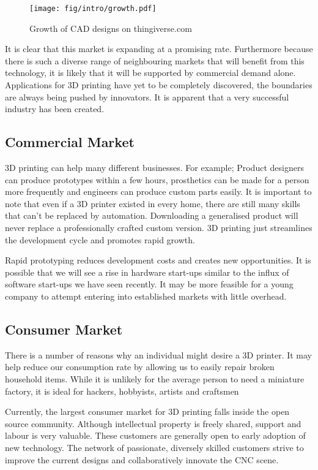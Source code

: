 \documentclass[a4paper, 11pt, twoside]{Thesis}  %
\begin{document}
\begin{figure}[H]
\centering%
\texttt{[image: fig/intro/growth.pdf]}
\caption{Growth of CAD designs on thingiverse.com \cite{6}}
\label{fig:growth.pdf}
\end{figure}
It is clear that this market is expanding at a promising rate. Furthermore because there is such a diverse range of neighbouring markets that will benefit from this technology, it is likely that it will be supported by commercial demand alone. Applications for 3D printing have yet to be completely discovered, the boundaries are always being pushed by innovators. It is apparent that a very successful industry has been created.


\subsection{Commercial Market}

3D printing can help many different businesses. For example; Product designers can produce prototypes within a few hours, prosthetics can be made for a person more frequently and engineers can produce custom parts easily. It is important to note that even if a 3D printer existed in every home, there are still many skills that can't be replaced by automation. Downloading a generalised product will never replace a professionally crafted custom version. 3D printing just streamlines the development cycle and promotes rapid growth.

Rapid prototyping reduces development costs and creates new opportunities. It is possible that we will see a rise in hardware start-ups similar to the influx of software start-ups we have seen recently. It may be more feasible for a young company to attempt entering into established markets with little overhead.

\subsection{Consumer Market}

There is a number of reasons why an individual might desire a 3D printer. It may help reduce our consumption rate by allowing us to easily repair broken household items. While it is unlikely for the average person to need a miniature factory, it is ideal for hackers, hobbyists, artists and craftsmen

Currently, the largest consumer market for 3D printing falls inside the open source community. Although intellectual property is freely shared, support and labour is very valuable. These customers are generally open to early adoption of new technology. The network of passionate, diversely skilled customers strive to improve the current designs and collaboratively innovate the CNC scene.
\end{document}
